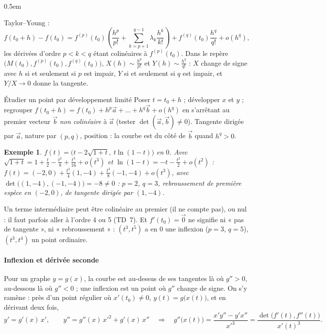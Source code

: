 \documentclass[a4paper,11pt]{article}
\makeatletter
\numberwithin{equation}{section}
\numberwithin{figure}{section}
\numberwithin{table}{section}
\theoremstyle{enonce}
\theoremstyle{exemple}
\newtheorem{exemple}[definition]{Exemple}
\theoremstyle{remarque}
\renewcommand{\proofname}{Démonstration}
\renewenvironment{proof}[1][\proofname]{\par\pushQED{\qed}\normalfont
  \topsep0.5em\relax\trivlist\item[\hskip\labelsep\sffamily\itshape\color{Gris}#1.]\ignorespaces}
  {\popQED\endtrivlist\@endpefalse}
\newcommand{\ve}[1]{\vec{#1}}
\makeatother
\begin{document}
\begin{proof}
Taylor--Young :
\[f(t_0+h)-f(t_0)=f^{(p)}(t_0)\left(\frac{h^p}{p!}+\sum_{k=p+1}^{q-1}\lambda_k\frac{h^k}{k!}\right)+f^{(q)}(t_0)\frac{h^q}{q!}+o(h^q),\]
les dérivées d'ordre $p<k<q$ étant colinéaires à $f^{(p)}(t_0)$. Dans le repère $\big(M(t_0),f^{(p)}(t_0),f^{(q)}(t_0)\big)$,
$X(h)\sim\frac{h^p}{p!}$ et $Y(h)\sim\frac{h^q}{q!}$ : $X$ change de signe avec $h$ si et seulement si $p$ est impair, $Y$ si et
seulement si $q$ est impair, et $Y/X\to0$ donne la tangente.
\end{proof}

\begin{methode}{Étudier un point par développement limité}\label{meth:dl}
Poser $t=t_0+h$ ; développer $x$ et $y$ ; regrouper $f(t_0+h)=f(t_0)+h^p\ve a+\dots+h^q\ve b+o(h^q)$ en s'arrêtant au premier
vecteur $\ve b$ \emph{non colinéaire} à $\ve a$ (tester $\det(\ve a,\ve b)\neq0$). Tangente dirigée par $\ve a$, nature par
$(p,q)$, position : la courbe est du côté de $\ve b$ quand $h^q>0$.
\end{methode}

\begin{exemple}
$f(t)=\big(t-2\sqrt{1+t},\ t\ln(1-t)\big)$ en $0$. Avec $\sqrt{1+t}=1+\frac t2-\frac{t^2}8+\frac{t^3}{16}+o(t^3)$ et
$\ln(1-t)=-t-\frac{t^2}2+o(t^2)$ :
$f(t)=(-2,0)+\frac{t^2}4(1,-4)+\frac{t^3}8(-1,-4)+o(t^3)$, avec $\det\big((1,-4),(-1,-4)\big)=-8\neq0$ : $p=2$, $q=3$,
rebroussement de première espèce en $(-2,0)$, de tangente dirigée par $(1,-4)$.
\end{exemple}

\begin{attention}
Un terme intermédiaire peut être colinéaire au premier (il ne compte pas), ou nul : il faut parfois aller à l'ordre 4 ou 5
(TD~7). Et $f'(t_0)=\ve0$ ne signifie ni « pas de tangente », ni « rebroussement » : $(t^3,t^5)$ a en $0$ une inflexion
($p=3$, $q=5$), $(t^3,t^4)$ un point ordinaire.
\end{attention}

\paragraph{Inflexion et dérivée seconde} Pour un graphe $y=g(x)$, la courbe est au-dessus de ses tangentes là où $g''>0$,
au-dessous là où $g''<0$ ; une inflexion est un point où $g''$ change de signe. On s'y ramène : près d'un point régulier où
$x'(t_0)\neq0$, $y(t)=g\big(x(t)\big)$, et en dérivant deux fois,
\[y'=g'(x)\,x',\qquad y''=g''(x)\,x'^2+g'(x)\,x''\quad\Longrightarrow\quad
g''\big(x(t)\big)=\frac{x'y''-y'x''}{x'^3}=\frac{\det\big(f'(t),f''(t)\big)}{x'(t)^3}.\]
\end{document}
